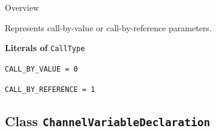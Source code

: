 	\begin{longdescription}
		\item[Overview] 		
				

	

		Represents call-by-value or call-by-reference parameters.		
	
		\item[\textbf{Literals of} \texttt{CallType}] ~
		\begin{longdescription}
			
\item[\texttt{CALL\_BY\_VALUE = 0}] ~
\nopagebreak

\item[\texttt{CALL\_BY\_REFERENCE = 1}] ~
\nopagebreak
		\end{longdescription}
	\end{longdescription}
	
	

\subsection{Class \bfseries \texttt{ChannelVariableDeclaration}\normalfont}
\label{cls:uppaal::declarations::ChannelVariableDeclaration} 
	
